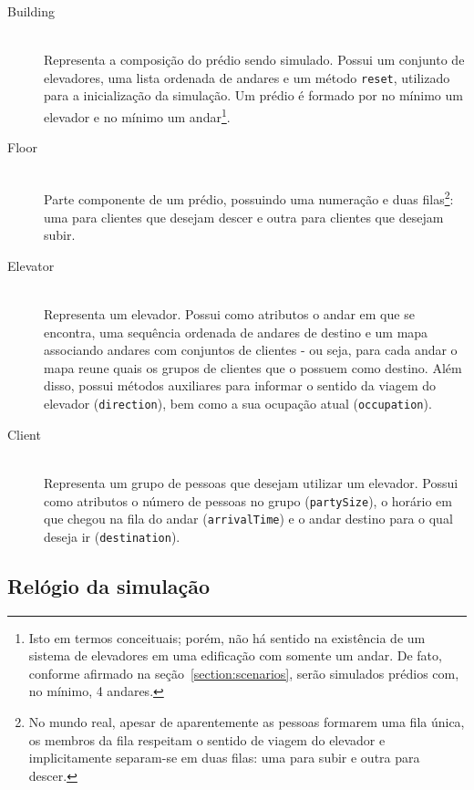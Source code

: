 \begin{description}
  \item[Building] \hfill \\
    Representa a composição do prédio sendo simulado. Possui um conjunto de
    elevadores, uma lista ordenada de andares e um método \texttt{reset},
    utilizado para a inicialização da simulação. Um prédio é formado por no
    mínimo um elevador e no mínimo um andar\footnote{Isto em termos conceituais;
    porém, não há sentido na existência de um sistema de elevadores em uma
    edificação com somente um andar. De fato, conforme afirmado na
    seção~\ref{section:scenarios}, serão simulados prédios com, no mínimo, 4
    andares.}.

  \item[Floor] \hfill \\
    Parte componente de um prédio, possuindo uma numeração e duas
    filas\footnote{No mundo real, apesar de aparentemente as pessoas formarem
    uma fila única, os membros da fila respeitam o sentido de viagem do elevador
    e implicitamente separam-se em duas filas: uma para subir e outra para
    descer.}: uma para clientes que desejam descer e outra para clientes que
    desejam subir.

\item[Elevator] \hfill \\
    Representa um elevador. Possui como atributos o andar em que se
    encontra, uma sequência ordenada de andares de destino e um mapa associando
    andares com conjuntos de clientes - ou seja, para cada andar o mapa reune
    quais os grupos de clientes que o possuem como destino. Além disso, possui
    métodos auxiliares para informar o sentido da viagem do elevador
    (\texttt{direction}), bem como a sua ocupação atual (\texttt{occupation}).

\item[Client] \hfill \\
    Representa um grupo de pessoas que desejam utilizar um elevador. Possui como
    atributos o número de pessoas no grupo (\texttt{partySize}), o horário em
    que chegou na fila do andar (\texttt{arrivalTime}) e o andar destino para o
    qual deseja ir (\texttt{destination}).

\end{description}

\subsection{Relógio da simulação}

